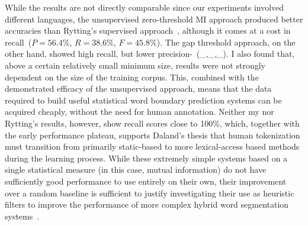 While the results are not directly comparable since our experiments involved different languages, the unsupervised zero-threshold MI approach produced better accuracies than Rytting's supervised approach~\cite{rytting04}, although it comes at a cost in recall\textemdash~($P = 56.4\%$, $R = 38.6\%$, $F = 45.8\%$). The gap threshold approach, on the other hand, showed high recall, but lower precision-\textemdash~(\_,\_,\_). I also found that, above a certain relatively small minimum size, results were not strongly dependent on the size of the training corpus. This, combined with the demonstrated efficacy of the unsupervised approach, means that the data required to build useful statistical word boundary prediction systems can be acquired cheaply, without the need for human annotation. Neither my nor Rytting's results, however, show recall scores close to 100\%, which, together with the early performance plateau, supports Daland's thesis that human tokenization must transition from primarily static-based to more lexical-access based methods during the learning process. While these extremely simple systems based on a single statistical measure (in this case, mutual information) do not have sufficiently good performance to use entirely on their own, their improvement over a random baseline is sufficient to justify investigating their use as heuristic filters to improve the performance of more complex hybrid word segmentation systems~\cite{kearsley14}.

